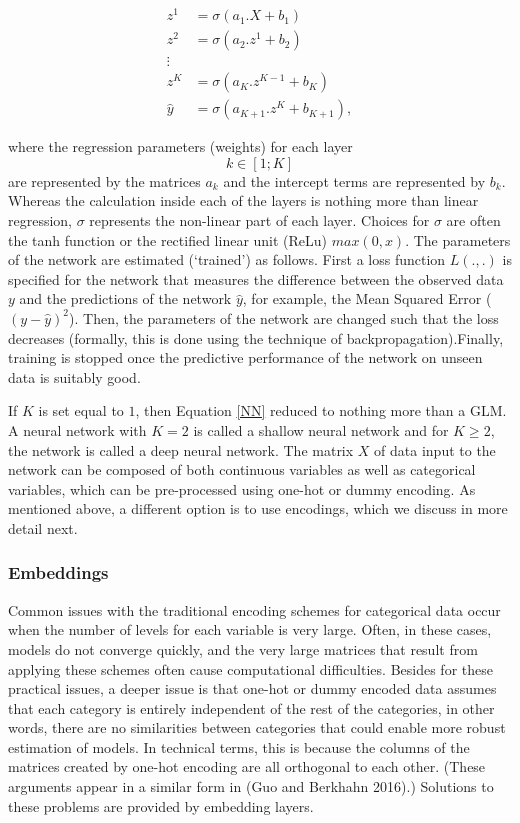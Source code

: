 \documentclass{article}
\begin{document}
\begin{equation} 
\label{NN}
\begin{split}
z^1 &= \sigma(a_1.X+ b_1) \\
z^2 &= \sigma(a_2.z^1+ b_2) \\
\vdots \\
z^K &= \sigma(a_{K}.z^{K-1}+ b_{K}) \\
\hat{y} &= \sigma(a_{K+1}.z^{K}+ b_{K+1}),
\end{split}
\end{equation}

where the regression parameters (weights) for each layer \[k \in [1;K]\]
are represented by the matrices \(a_k\) and the intercept terms are
represented by \(b_k\). Whereas the calculation inside each of the
layers is nothing more than linear regression, \(\sigma\) represents the
non-linear part of each layer. Choices for \(\sigma\) are often the tanh
function or the rectified linear unit (ReLu) \(max(0,x)\). The
parameters of the network are estimated (`trained') as follows. First a
loss function \(L(.,.)\) is specified for the network that measures the
difference between the observed data \(y\) and the predictions of the
network \(\hat{y}\), for example, the Mean Squared Error
(\((y - \hat{y})^2\)). Then, the parameters of the network are changed
such that the loss decreases (formally, this is done using the technique
of backpropagation).Finally, training is stopped once the predictive
performance of the network on unseen data is suitably good.

If \(K\) is set equal to \(1\), then Equation \ref{NN} reduced to
nothing more than a GLM. A neural network with \(K=2\) is called a
shallow neural network and for \(K \geq 2\), the network is called a
deep neural network. The matrix \(X\) of data input to the network can
be composed of both continuous variables as well as categorical
variables, which can be pre-processed using one-hot or dummy encoding.
As mentioned above, a different option is to use encodings, which we
discuss in more detail next.

\hypertarget{embeddings}{%
\subsubsection{Embeddings}\label{embeddings}}

Common issues with the traditional encoding schemes for categorical data
occur when the number of levels for each variable is very large. Often,
in these cases, models do not converge quickly, and the very large
matrices that result from applying these schemes often cause
computational difficulties. Besides for these practical issues, a deeper
issue is that one-hot or dummy encoded data assumes that each category
is entirely independent of the rest of the categories, in other words,
there are no similarities between categories that could enable more
robust estimation of models. In technical terms, this is because the
columns of the matrices created by one-hot encoding are all orthogonal
to each other. (These arguments appear in a similar form in (Guo and
Berkhahn 2016).) Solutions to these problems are provided by embedding
layers.
\end{document}
